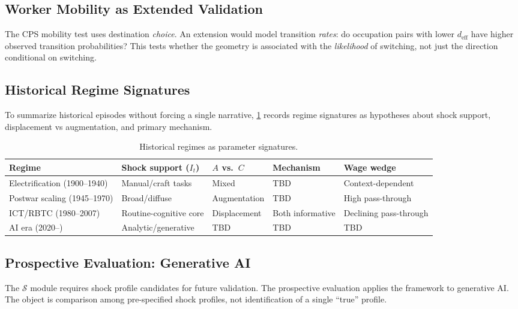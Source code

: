 \documentclass[12pt]{article}
\begin{document}
\subsection{Worker Mobility as Extended Validation}
\label{subsec:mobility-extension}


The CPS mobility test uses destination \emph{choice}. An extension would model transition \emph{rates}: do occupation pairs with lower $d_{\mathrm{eff}}$ have higher observed transition probabilities? This tests whether the geometry is associated with the \emph{likelihood} of switching, not just the direction conditional on switching.


\subsection{Historical Regime Signatures}


To summarize historical episodes without forcing a single narrative, \cref{tab:regimes} records regime signatures as hypotheses about shock support, displacement vs augmentation, and primary mechanism.


\begin{table}[h!]
\centering
\begin{tabular}{|l|l|l|l|l|}
\hline
\textbf{Regime} & \textbf{Shock support ($I_t$)} & \textbf{$A$ vs.\ $C$} & \textbf{Mechanism} & \textbf{Wage wedge} \\
\hline
Electrification (1900--1940) & Manual/craft tasks & Mixed & TBD & Context-dependent \\
\hline
Postwar scaling (1945--1970) & Broad/diffuse & Augmentation & TBD & High pass-through \\
\hline
ICT/RBTC (1980--2007) & Routine-cognitive core & Displacement & Both informative & Declining pass-through \\
\hline
AI era (2020--) & Analytic/generative & TBD & TBD & TBD \\
\hline
\end{tabular}
\caption{Historical regimes as parameter signatures.}
\label{tab:regimes}
\end{table}


\subsection{Prospective Evaluation: Generative AI}
\label{subsec:prospective}


The $\mathcal{S}$ module requires shock profile candidates for future validation. The prospective evaluation applies the framework to generative AI. The object is comparison among pre-specified shock profiles, not identification of a single ``true'' profile.
\end{document}
